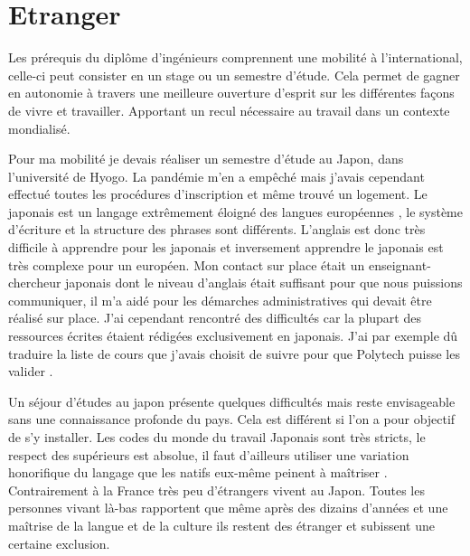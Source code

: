 \documentclass[french,a4paper,12pt]{report}
\begin{document}
\chapter{Etranger}

Les prérequis du diplôme d'ingénieurs comprennent une mobilité à l'international, celle-ci peut consister en un stage ou un semestre d'étude. Cela permet de gagner en autonomie à travers une meilleure ouverture d'esprit sur les différentes façons de vivre et travailler. Apportant un recul nécessaire au travail dans un contexte mondialisé. 


Pour ma mobilité je devais réaliser un semestre d'étude au Japon, dans l'université de Hyogo. La pandémie m’en a empêché mais j’avais cependant effectué toutes les procédures d’inscription et même trouvé un logement. Le japonais est un langage extrêmement éloigné des langues européennes , le système d’écriture et la structure des phrases sont différents. L’anglais est donc très difficile à apprendre pour les japonais et inversement apprendre le japonais est très complexe pour un européen.%
Mon contact sur place était un enseignant-chercheur japonais dont le niveau d’anglais était suffisant pour que nous puissions communiquer, il m’a aidé pour les démarches administratives qui devait être réalisé sur place. J’ai cependant rencontré des difficultés car la plupart des ressources écrites étaient rédigées exclusivement en japonais. J’ai par exemple dû traduire la liste de cours que j’avais choisit de suivre pour que Polytech puisse les valider .

Un séjour d'études au japon présente quelques difficultés mais reste envisageable sans une connaissance profonde du pays. Cela est différent si l'on a pour objectif de s'y installer.
Les codes du monde du travail Japonais sont très stricts, le respect des supérieurs est absolue, il faut d'ailleurs utiliser une variation honorifique du langage que les natifs eux-même peinent à maîtriser .
Contrairement à la France très peu d'étrangers vivent au Japon. Toutes les personnes vivant là-bas rapportent que même après des dizains d’années et une maîtrise de la langue et de la culture ils restent des étranger et subissent une certaine exclusion.\\
\end{document}
